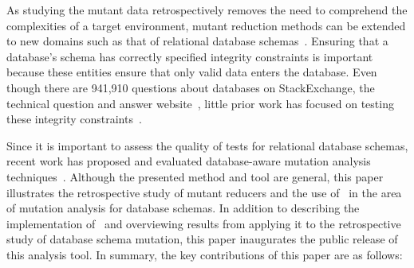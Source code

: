 

As studying the mutant data retrospectively removes the need to comprehend the complexities of a target environment,
mutant reduction methods can be extended to new domains such as that of relational database
schemas~\cite{mcminn2016virtual, mcminn2015effectiveness, wright2013efficient}. Ensuring that a database's schema has
correctly specified integrity constraints is important because these entities ensure that only valid data enters the
database. Even though there are 941,910 questions about databases on StackExchange, the technical question and answer
website~\cite{stackexchange}, little prior work has focused on testing these integrity
constraints~\cite{mcminn2016virtual}.




Since it is important to assess the quality of tests for relational database schemas, recent work has proposed and
evaluated database-aware mutation analysis techniques~\cite{mcminn2016virtual, mcminn2015effectiveness,
wright2013efficient}. Although the presented method and tool are general, this paper illustrates the retrospective study
of mutant reducers and the use of \mr~in the area of mutation analysis for database schemas. In addition to describing
the implementation of \mr~and overviewing results from applying it to the retrospective study of database schema
mutation, this paper inaugurates the public release of this analysis tool. In summary, the key contributions of this
paper are as follows:

